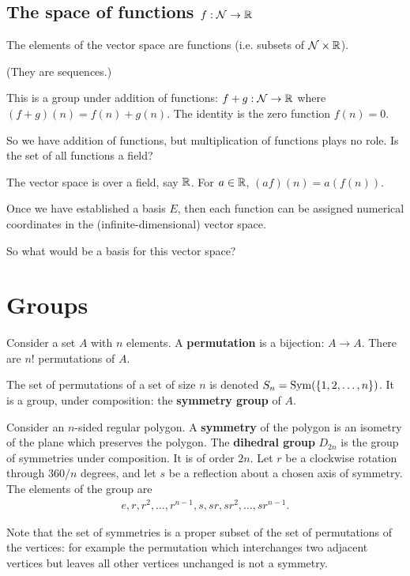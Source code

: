 \subsection{The space of functions $f:\mathcal{N} \to \mathbb{R}$}

The elements of the vector space are functions (i.e. subsets of $\mathcal{N} \times \mathbb{R}$).

(They are sequences.)

This is a group under addition of functions: $f + g: \mathcal{N} \to \mathbb{R}$ where
$(f + g)(n) = f(n) + g(n)$. The identity is the zero function $f(n) = 0$.

So we have addition of functions, but multiplication of functions plays no
role. Is the set of all functions a field?


The vector space is over a field, say $\mathbb{R}$. For $a \in \mathbb{R}$, $(af)(n) = a(f(n))$.

Once we have established a basis $E$, then each function can be assigned
numerical coordinates in the (infinite-dimensional) vector space.

So what would be a basis for this vector space?




\newpage
\section{Groups}

Consider a set $A$ with $n$ elements. A \textbf{permutation} is a bijection:
$A \to A$. There are $n!$ permutations of $A$.

The set of permutations of a set of size $n$ is denoted
$S_n = \text{Sym}(\{1,2,\ldots,n\})$. It is a group, under composition: the
\textbf{symmetry group} of $A$.

Consider an $n$-sided regular polygon. A \textbf{symmetry} of the polygon is an
isometry of the plane which preserves the polygon. The \textbf{dihedral group}
$D_{2n}$ is the group of symmetries under composition. It is of order $2n$. Let
$r$ be a clockwise rotation through $360/n$ degrees, and let $s$ be a
reflection about a chosen axis of symmetry. The elements of the group are
\begin{align*}
  e, r, r^2, \ldots, r^{n-1}, s, sr, sr^2, \ldots, sr^{n-1}.
\end{align*}

Note that the set of symmetries is a proper subset of the set of permutations
of the vertices: for example the permutation which interchanges two adjacent
vertices but leaves all other vertices unchanged is not a symmetry.


